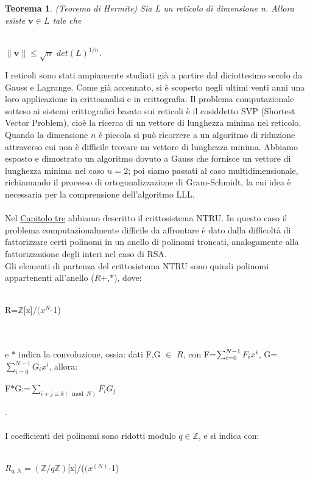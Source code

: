 \documentclass[a4paper,12pt]{report}
\theoremstyle{plain}
\newtheorem{thm}{Teorema}[section]
\theoremstyle{definition}
\theoremstyle{remark}
\begin{document}
\begin{thm}{(Teorema di Hermite)}
Sia L un reticolo di dimensione n. Allora esiste $\textbf{v}\in L$ tale che \\ \\ \centerline{$\rVert\textbf{v}\rVert\le\sqrt{n}$ $det(L)^{1/n}$.}



\end{thm}
I reticoli sono stati ampiamente studiati gi\` a a partire dal diciottesimo secolo da Gauss e Lagrange. Come gi\` a accennato, si \` e scoperto negli ultimi venti anni una loro applicazione in crittoanalisi e in crittografia. Il problema computazionale sotteso ai sistemi crittografici basato sui reticoli \` e il cosiddetto SVP (Shortest Vector Problem), cio\` e la ricerca di un vettore di lunghezza minima nel reticolo. Quando la dimensione $n$ \` e piccola si pu\`o ricorrere a un algoritmo di riduzione attraverso cui non \`e difficile trovare un vettore di lunghezza minima.
Abbiamo esposto e dimostrato un algoritmo dovuto a Gauss che fornisce un vettore di lunghezza minima nel caso $n=2$; poi siamo passati al caso multidimensionale, richiamando il processo di ortogonalizzazione di Gram-Schmidt, la cui idea \`e necessaria per la comprensione dell'algoritmo LLL.\\ \\
Nel \underline {Capitolo tre} abbiamo descritto il crittosistema NTRU. In questo caso il problema computazionalmente difficile da affrontare \`e dato dalla difficolt\` a di fattorizzare certi polinomi in un anello di polinomi troncati, analogamente alla fattorizzazione degli interi nel caso di RSA.\\
Gli elementi di partenza del crittosistema NTRU sono quindi polinomi appartenenti all'anello ($R$+,$\ast$), dove:  \\ \\ \centerline{ R=$\mathbb{Z}$[x]/$(x^{N}$-1)}\\ \\e $\ast$ indica la convoluzione, ossia: dati F,G $\in$ $R$, con F=$	\sum_{ \\ i=0}^{N-1} F_{i}x^i$, G=$	\sum_{i=0}^{N-1} G_{i}x^i$, allora:\\ \centerline{
F$\ast$G:=$	\sum_{i+j \equiv k (\bmod N)} F_{i}G_{j}$}.\\ \\  I coefficienti dei polinomi sono ridotti modulo $q\in \mathbb{Z}$, e si indica con:\\ \\ \centerline{ $R_{q,N}=(\mathbb{Z}/q\mathbb{Z})$[x]/($(x^{(N)}$-1)}\\ \\
\end{document}
